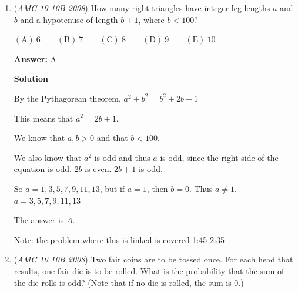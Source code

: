 \begin{enumerate}
\textbf{Solution 3 (cheese)}

Notice that the answer must be in the form $(-a,b)$, so $\textbf{(C)}, \textbf{(D)}$ and $\textbf{(E)}$ will not be the answer

 Using graphing paper and a protractor, the answer can be estimated to be $\boxed{\textbf{(B)} \left( - \frac {5}{3}\sqrt {3},5\right)}$




\textbf{Solution 4 (complex)}

Following the same steps as Solution 1, we can find that the coordinates of A are $\left(5,\frac{5\sqrt{3}}{3}\right)$. To find what the point $90^{\circ}$ counterclockwise, we do:

 
 \[\left(5 + \frac{5i\sqrt{3}}{3}\right) \left(e^{\frac{\pi i}{2}}\right) = -\frac{5\sqrt{3}}{3} + 5i\]

 Therefore, the coordinates are: $\boxed{\left(-\frac{5\sqrt{3}}{3}, 5\right)}$



	\item (\textit{AMC 10 10B 2008}) How many right triangles have integer leg lengths $a$ and $b$ and a hypotenuse of length $b+1$, where $b<100$?


 $\mathrm{(A)}\ 6\qquad\mathrm{(B)}\ 7\qquad\mathrm{(C)}\ 8\qquad\mathrm{(D)}\ 9\qquad\mathrm{(E)}\ 10$

 \textbf{Answer: }A



\textbf{Solution}

By the Pythagorean theorem, $a^2+b^2=b^2+2b+1$

 This means that $a^2=2b+1$.

 We know that $a,b>0$ and that $b<100$.

 We also know that $a^2$ is odd and thus $a$ is odd, since the right side of the equation is odd. $2b$ is even. $2b+1$ is odd.

 So $a=1,3,5,7,9,11,13$, but if $a=1$, then $b=0$. Thus $a\neq1.$
$a=3,5,7,9,11,13$

 The answer is $\boxed{A}$.

 Note: the problem where this is linked is covered 1:45-2:35

 


	\item (\textit{AMC 10 10B 2008}) Two fair coins are to be tossed once. For each head that results, one fair die is to be rolled. What is the probability that the sum of the die rolls is odd? (Note that if no die is rolled, the sum is $0$.)



\end{enumerate}
